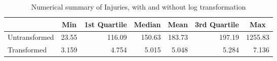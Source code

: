 \begin{table}[h!]
\centering
\begin{tabular}{|l|r|r|r|r|r|r|}
\hline
\rowcolor[HTML]{E7EAF6} 
\multicolumn{1}{|c|}{\textbf{}} & \multicolumn{1}{c|}{Min} & \multicolumn{1}{c|}{1st Quartile} & \multicolumn{1}{c|}{Median} & \multicolumn{1}{c|}{Mean} & \multicolumn{1}{c|}{3rd Quartile} & \multicolumn{1}{c|}{Max} \\ \hline
Untransformed & 23.55 & 116.09 & 150.63 & 183.73 & 197.19 & 1255.83 \\ \hline
Transformed & 3.159 & 4.754 & 5.015 & 5.048 & 5.284 & 7.136 \\ \hline
\end{tabular}
\caption{Numerical summary of Injuries, with and without log transformation}
\end{table}